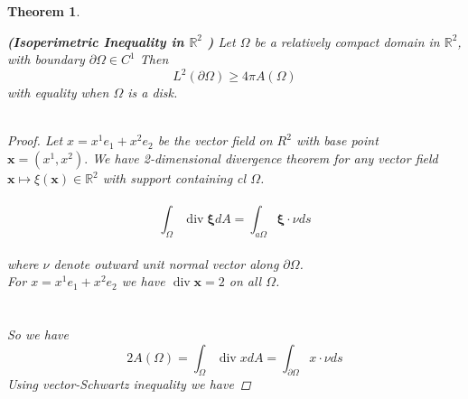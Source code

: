 \documentclass[oneside]{book}
\newtheorem{theorem}{Theorem}[section]
\begin{document}
\begin{theorem}
\label{t:2}

 \textbf{(Isoperimetric Inequality in $\mathbb{R}^{2}$ )} Let $\Omega$ be a relatively compact domain in $\mathbb{R}^{2}$, with boundary $\partial \Omega \in C^{1}$ Then
      \begin{equation}
      \label{eq14}  
   L^{2}(\partial \Omega) \geq 4 \pi A(\Omega) 
      \end{equation}
 with equality when $\Omega$ is a disk.\\\\

\begin{proof}

 Let $x=x^{1} e_{1}+x^{2} e_{2}$ be the vector field on $R^{2}$ with base point $\textbf{x}=\left(x^{1}, x^{2}\right) .$
We have 2-dimensional divergence theorem for any vector
field $\textbf{x} \mapsto \xi(\textbf{x}) \in \mathbb{R}^{2}$ with support containing cl $\Omega$.
\\\\
    \begin{equation}
    \label{eq15}  
\int_{\Omega} \operatorname{div} \boldsymbol{\xi} d A=\int_{a \Omega} \boldsymbol{\xi} \cdot \nu d s 
  \end{equation} \\
  
where $\nu$ denote outward unit normal vector along $\partial\Omega$. \\
    
For  $ x=x^{1} e_{1}+x^{2} e_{2}$ we have 
$\operatorname{div} \textbf{x}=2$ on all $\Omega$. 
\\\\\\
So we have
\\
$$ 2 A(\Omega)=\int_{\Omega} \operatorname{div} x d A=\int_{\partial \Omega} x \cdot \nu d s$$ 
Using vector-Schwartz inequality we have 


\end{proof}
\end{theorem}
\end{document}
